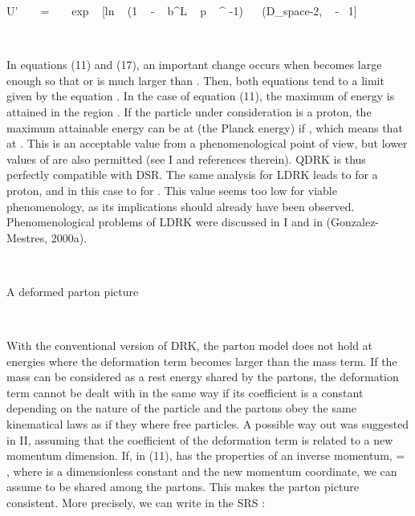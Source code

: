 \documentclass[a4paper,12pt,dvips]{article}
\makeatletter
\renewcommand{\section}{\@startsection{section}{1}{0in}
	{0.4\baselineskip}{0.1\baselineskip}{\Large\bf}}
\makeatother
\begin{document}
\equation
U' ~ ~ = ~ ~ exp ~ [ln ~ (1 ~ - ~ b^L ~ p ~ \sigma ^ {-1}) ~ ~(D_{space-2, } ~ - ~1]
\endequation
\noindent

~ 

In equations (11) and (17), an important change occurs when \coordHE{} becomes large enough so that \coordHE{} or \coordHE{} is much larger than \coordHE{}. Then, both equations tend to a limit given by the equation \coordHE{} . In the case of equation (11), the maximum of energy is attained in the region \coordHE{} . If the particle under consideration is a proton, the maximum attainable energy can be at \coordHE{} (the Planck energy) if \coordHE{} , which means that \coordHE{} at \coordHE{} . This is an acceptable value from a phenomenological point of view, but lower values of \coordHE{} are also permitted (see I and references therein). QDRK is thus perfectly compatible with DSR. The same analysis for LDRK leads to \coordHE{} for a proton, and in this case to \coordHE{} for \coordHE{} . This value seems too low for viable phenomenology, as its implications should already have been observed. Phenomenological problems of LDRK were discussed in I and in (Gonzalez-Mestres, 2000a).

~
~ 

\section{A deformed parton picture}
\label{DPP.sec}

~

With the conventional version of DRK, the parton model does not hold at energies where the deformation term becomes larger than the mass term. If the mass can be considered as a rest energy shared by the partons, the deformation term cannot be dealt with in the same way if its coefficient is a constant depending on the nature of the particle and the partons obey the same kinematical laws as if they where free particles. A possible way out was suggested in II, assuming that the coefficient of the deformation term is related to a new momentum dimension. If, in (11), \coordHE{} has the properties of an inverse momentum, \coordHE{} = \coordHE{}  \coordHE{} , where \coordHE{} is a dimensionless constant and \myHighlight{$\eta$}\coordHE{} the new momentum coordinate, we can assume \myHighlight{$\eta $}\coordHE{} to be shared among the partons. This makes the parton picture consistent. More precisely, we can write in the SRS :
\end{document}
